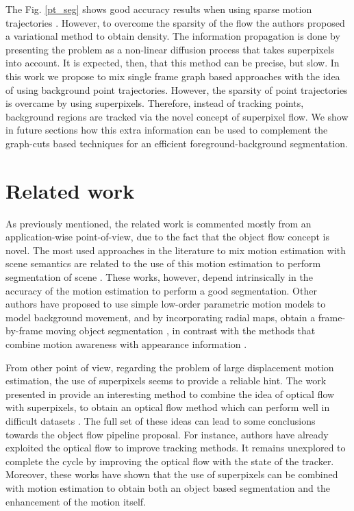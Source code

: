 The Fig. \ref{pt_seg} shows good accuracy results when using sparse motion trajectories \cite{c34}. However, to overcome 
the sparsity of the flow the authors proposed a variational method to obtain density. The information propagation is done 
by presenting the problem as a non-linear diffusion process that takes superpixels into account. It is expected, then, that this 
method can be precise, but slow.
In this work we propose to mix single frame graph based approaches with the idea 
of using background point trajectories. However, the sparsity of point trajectories is 
overcame by using superpixels. Therefore, instead of tracking points, background regions are tracked via the novel concept of 
superpixel flow. 
We show in future sections how this extra information can be used to complement the
graph-cuts based techniques for an efficient foreground-background segmentation. 

\section{Related work}

As previously mentioned, the related work is commented mostly from an application-wise point-of-view, due to the fact that 
the object flow concept is novel. The most used approaches in the literature to mix motion estimation with scene semantics 
are related to the use of this motion estimation to perform segmentation of scene \cite{c33}\cite{c34}. These works, however, depend 
intrinsically in the accuracy of the motion estimation to perform a good segmentation. Other authors have proposed to use simple 
low-order parametric motion models to model background movement, and by incorporating radial maps, obtain a frame-by-frame 
moving object segmentation \cite{c36}, in contrast with the methods that combine motion awareness with appearance information \cite{c35}. 

From other point of view, regarding the problem of large displacement motion estimation, the use of superpixels seems to provide a reliable hint. The work presented in \cite{c39} 
provide an interesting method to combine the idea of optical flow with superpixels, to obtain an optical flow method which can perform well in difficult datasets \cite{c27}. 
The full set of these ideas can lead to some conclusions towards the object flow pipeline proposal. For instance, authors have already exploited the optical flow 
to improve tracking methods. It remains unexplored to complete the cycle by improving the optical flow with the state of the tracker. Moreover, these works have shown 
that the use of superpixels can be combined with motion estimation to obtain both an object based segmentation and the enhancement of the motion itself.

